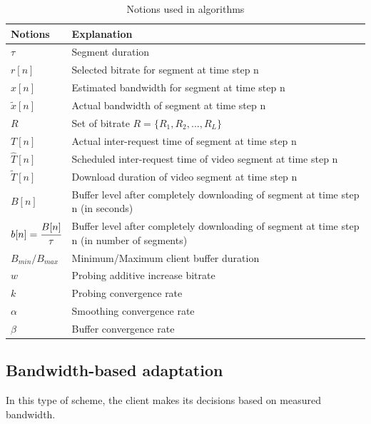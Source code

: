 \documentclass[journal]{IEEEtran}
\begin{document}
\begin{table}[]
    \centering
  
    \caption{Notions used in algorithms}
    \label{notions}
    
	\begin{tabularx}{0.5\textwidth}{|l|X|} 
		\hline
		Notions & Explanation  \\ [0.5ex] 
		\hline\hline
		$\tau$ & Segment duration  \\ 
		\hline
		$r[n]$ & Selected bitrate for segment at time step n  \\
		\hline
		 $\hat{x}[n]$& Estimated bandwidth for segment at time step n \\
		\hline
		$\tilde{x}[n]$ & Actual bandwidth of segment at time step n  \\
		\hline
		$R$ & Set of bitrate $R=\{R_1, R_2,...,R_L\}$  \\ 
		\hline
		$T[n]$ & Actual inter-request time of segment at time step n \\  
		\hline
			$\hat{T}[n]$ & Scheduled inter-request time of video segment at time step n \\
			\hline
			$\tilde{T}[n]$ & Download duration of video segment at time step n \\
			\hline
			$B[n]$ & Buffer level after completely downloading of segment at time step n (in seconds) \\
			\hline
			$b[n] = \cfrac{B[n]}{\tau}$ & Buffer level after completely downloading of segment at time step n (in number of segments) \\
			\hline
			$B_{min}/B_{max}$ & Minimum/Maximum client buffer duration \\
			\hline
			$w$ & Probing additive increase bitrate \\
			\hline
			$k$ & Probing convergence rate \\
			\hline
			$\alpha$ & Smoothing convergence rate\\
			\hline
			$\beta$ & Buffer convergence rate\\
			\hline
		
	\end{tabularx}

\end{table}
\subsection{Bandwidth-based adaptation}
In this type of scheme, the client makes its decisions based on measured bandwidth.
\end{document}
